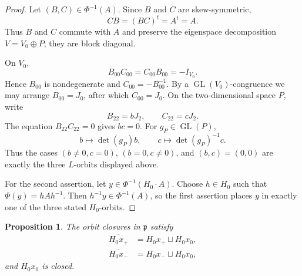 \documentclass[10pt,a4paper]{amsart}
\numberwithin{equation}{section}
\newtheorem{proposition}[theorem]{Proposition}
\newcommand{\GL}{\operatorname{GL}}
\newcommand{\fp}{\mathfrak p}
\begin{document}
\begin{proof}
Let $(B,C)\in\Phi^{-1}(A)$.  Since $B$ and $C$ are skew-symmetric,
\[
  CB=(BC)^t=A^t=A.
\]
Thus $B$ and $C$ commute with $A$ and preserve the eigenspace decomposition
$V=V_0\oplus P$; they are block diagonal.

On $V_0$,
\[
  B_{00}C_{00}=C_{00}B_{00}=-I_{V_0}.
\]
Hence $B_{00}$ is nondegenerate and $C_{00}=-B_{00}^{-1}$.  By a
$\GL(V_0)$-congruence we may arrange $B_{00}=J_0$, after which
$C_{00}=J_0$.  On the two-dimensional space $P$, write
\[
  B_{22}=bJ_2,\qquad C_{22}=cJ_2.
\]
The equation $B_{22}C_{22}=0$ gives $bc=0$.  For $g_P\in\GL(P)$,
\[
  b\longmapsto\det(g_P)b,
  \qquad
  c\longmapsto\det(g_P)^{-1}c.
\]
Thus the cases $(b\ne0,c=0)$, $(b=0,c\ne0)$, and $(b,c)=(0,0)$ are exactly the three $L$-orbits displayed above.

For the second assertion, let $y\in\Phi^{-1}(H_0\cdot A)$.  Choose
$h\in H_0$ such that $\Phi(y)=hAh^{-1}$.  Then
$h^{-1}y\in\Phi^{-1}(A)$, so the first assertion places $y$ in exactly one of the three stated $H_0$-orbits.
\end{proof}

\begin{proposition}\label{diii:prop:closures}
The orbit closures in $\fp$ satisfy
\begin{align}
 \overline{H_0x_+}&=H_0x_+\sqcup H_0x_0,\label{diii:eq:clplus}\\
 \overline{H_0x_-}&=H_0x_-\sqcup H_0x_0,\label{diii:eq:clminus}
\end{align}
and $H_0x_0$ is closed.
\end{proposition}
\end{document}
